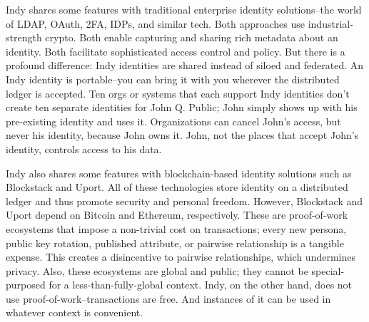 Indy shares some features with traditional enterprise identity solutions--the world of LDAP, OAuth, 2FA, IDPs, and similar tech. Both approaches use industrial-strength crypto. Both enable capturing and sharing rich metadata about an identity. Both facilitate sophisticated access control and policy. But there is a profound difference: Indy identities are shared instead of siloed and federated. An Indy identity is portable--you can bring it with you wherever the distributed ledger is accepted. Ten orgs or systems that each support Indy identities don’t create ten separate identities for John Q. Public; John simply shows up with his pre-existing identity and uses it. Organizations can cancel John’s access, but never his identity, because John owns it. John, not the places that accept John’s identity, controls access to his data.

Indy also shares some features with blockchain-based identity solutions such as Blockstack and Uport. All of these technologies store identity on a distributed ledger and thus promote security and personal freedom. However, Blockstack and Uport depend on Bitcoin and Ethereum, respectively. These are proof-of-work ecosystems that impose a non-trivial cost on transactions; every new persona, public key rotation, published attribute, or pairwise relationship is a tangible expense. This creates a disincentive to pairwise relationships, which undermines privacy. Also, these ecosystems are global and public; they cannot be special-purposed for a less-than-fully-global context. Indy, on the other hand, does not use proof-of-work--transactions are free. And instances of it can be used in whatever context is convenient.
